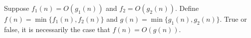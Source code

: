 \begin{prob}

    Suppose $f_1(n) = O(g_1(n))$ and $f_2 = O(g_2(n))$.
    Define $f(n) = \min \{ f_1(n), f_2(n) \}$ and $g(n) = \min \{ g_1(n), g_2(n) \}$.
    True or false, it is necessarily the case that $f(n) = O(g(n))$.

    \Tf{}

\end{prob}
